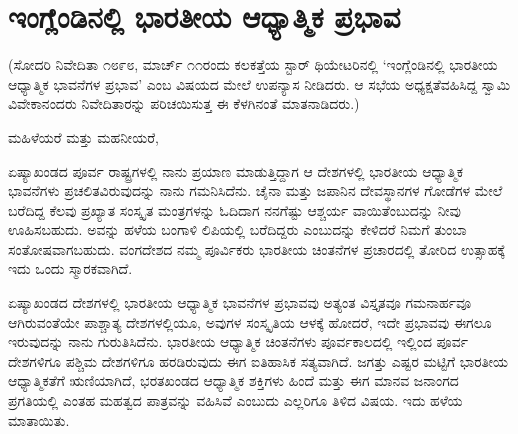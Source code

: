 
\chapter{ಇಂಗ್ಲೆಂಡಿನಲ್ಲಿ ಭಾರತೀಯ ಆಧ್ಯಾತ್ಮಿಕ ಪ್ರಭಾವ}

(ಸೋದರಿ ನಿವೇದಿತಾ ೧೮೯೮, ಮಾರ್ಚ್​ ೧೧ರಂದು ಕಲಕತ್ತೆಯ ಸ್ಟಾರ್​ ಥಿಯೇಟರಿನಲ್ಲಿ ‘ಇಂಗ್ಲೆಂಡಿನಲ್ಲಿ ಭಾರತೀಯ ಆಧ್ಯಾತ್ಮಿಕ ಭಾವನೆಗಳ ಪ್ರಭಾವ’ ಎಂಬ ವಿಷಯದ ಮೇಲೆ ಉಪನ್ಯಾಸ ನೀಡಿದರು. ಆ ಸಭೆಯ ಅಧ್ಯಕ್ಷತೆವಹಿಸಿದ್ದ ಸ್ವಾಮಿ ವಿವೇಕಾನಂದರು ನಿವೇದಿತಾರನ್ನು ಪರಿಚಯಿಸುತ್ತ ಈ ಕೆಳಗಿನಂತೆ ಮಾತನಾಡಿದರು.)

\vskip 5pt

ಮಹಿಳೆಯರೆ ಮತ್ತು ಮಹನೀಯರೆ,

\vskip 5pt

ಏಷ್ಯಾಖಂಡದ ಪೂರ್ವ ರಾಷ್ಟ್ರಗಳಲ್ಲಿ ನಾನು ಪ್ರಯಾಣ ಮಾಡುತ್ತಿದ್ದಾಗ ಆ ದೇಶಗಳಲ್ಲಿ ಭಾರತೀಯ ಆಧ್ಯಾತ್ಮಿಕ ಭಾವನೆಗಳು ಪ್ರಚಲಿತವಿರುವುದನ್ನು ನಾನು ಗಮನಿಸಿದೆನು. ಚೈನಾ ಮತ್ತು ಜಪಾನಿನ ದೇವಸ್ಥಾನಗಳ ಗೋಡೆಗಳ ಮೇಲೆ ಬರೆದಿದ್ದ ಕೆಲವು ಪ್ರಖ್ಯಾತ ಸಂಸ್ಕೃತ ಮಂತ್ರಗಳನ್ನು ಓದಿದಾಗ ನನಗೆಷ್ಟು ಆಶ್ಚರ್ಯ ವಾಯಿತೆಂಬುದನ್ನು ನೀವು ಊಹಿಸಬಹುದು. ಅವನ್ನು ಹಳೆಯ ಬಂಗಾಳಿ ಲಿಪಿಯಲ್ಲಿ ಬರೆದಿದ್ದರು ಎಂಬುದನ್ನು ಕೇಳಿದರೆ ನಿಮಗೆ ತುಂಬಾ ಸಂತೋಷವಾಗಬಹುದು. ವಂಗದೇಶದ ನಮ್ಮ ಪೂರ್ವಿಕರು ಭಾರತೀಯ ಚಿಂತನೆಗಳ ಪ್ರಚಾರದಲ್ಲಿ ತೋರಿದ ಉತ್ಸಾಹಕ್ಕೆ ಇದು ಒಂದು ಸ್ಮಾರಕವಾಗಿದೆ.

\vskip 5pt

ಏಷ್ಯಾಖಂಡದ ದೇಶಗಳಲ್ಲಿ ಭಾರತೀಯ ಆಧ್ಯಾತ್ಮಿಕ ಭಾವನೆಗಳ ಪ್ರಭಾವವು ಅತ್ಯಂತ ವಿಸ್ತೃತವೂ ಗಮನಾರ್ಹವೂ ಆಗಿರುವಂತೆಯೇ ಪಾಶ್ಚಾತ್ಯ ದೇಶಗಳಲ್ಲಿಯೂ, ಅವುಗಳ ಸಂಸ್ಕೃತಿಯ ಆಳಕ್ಕೆ ಹೋದರೆ, ಇದೇ ಪ್ರಭಾವವು ಈಗಲೂ ಇರುವುದನ್ನು ನಾನು ಗುರುತಿಸಿದೆನು. ಭಾರತೀಯ ಆಧ್ಯಾತ್ಮಿಕ ಚಿಂತನೆಗಳು ಪೂರ್ವಕಾಲದಲ್ಲಿ ಇಲ್ಲಿಂದ ಪೂರ್ವ ದೇಶಗಳಿಗೂ ಪಶ್ಚಿಮ ದೇಶಗಳಿಗೂ ಹರಡಿರುವುದು ಈಗ ಐತಿಹಾಸಿಕ ಸತ್ಯವಾಗಿದೆ. ಜಗತ್ತು ಎಷ್ಟರ ಮಟ್ಟಿಗೆ ಭಾರತೀಯ ಆಧ್ಯಾತ್ಮಿಕತೆಗೆ ಋಣಿಯಾಗಿದೆ, ಭರತಖಂಡದ ಆಧ್ಯಾತ್ಮಿಕ ಶಕ್ತಿಗಳು ಹಿಂದೆ ಮತ್ತು ಈಗ ಮಾನವ ಜನಾಂಗದ ಪ್ರಗತಿಯಲ್ಲಿ ಎಂತಹ ಮಹತ್ವದ ಪಾತ್ರವನ್ನು ವಹಿಸಿವೆ ಎಂಬುದು ಎಲ್ಲರಿಗೂ ತಿಳಿದ ವಿಷಯ. ಇದು ಹಳೆಯ ಮಾತಾಯಿತು.

\vskip 5pt

